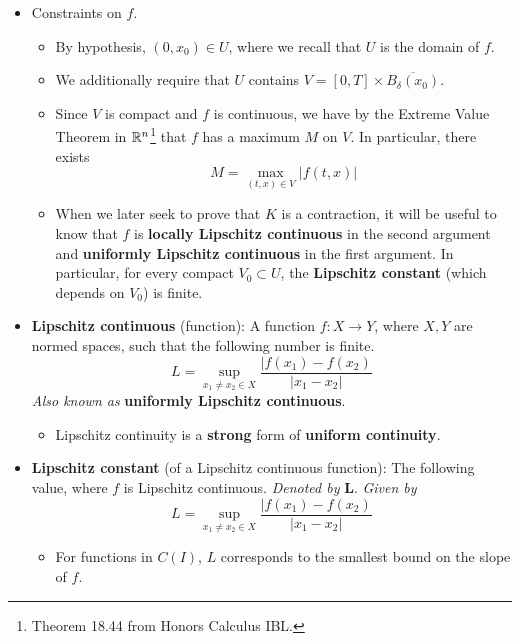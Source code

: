 \documentclass[../notes.tex]{subfiles}
\begin{document}
\begin{itemize}
\begin{itemize}
    \end{itemize}
    \item Constraints on $f$.
    \begin{itemize}
        \item By hypothesis, $(0,x_0)\in U$, where we recall that $U$ is the domain of $f$.
        \item We additionally require that $U$ contains $V=[0,T]\times\overline{B_\delta(x_0)}$.
        \item Since $V$ is compact and $f$ is continuous, we have by the Extreme Value Theorem in $\mathbb{R}^n$\footnote{Theorem 18.44 from Honors Calculus IBL.} that $f$ has a maximum $M$ on $V$. In particular, there exists
        \begin{equation*}
            M = \max_{(t,x)\in V}|f(t,x)|
        \end{equation*}
        \item When we later seek to prove that $K$ is a contraction, it will be useful to know that $f$ is \textbf{locally Lipschitz continuous} in the second argument and \textbf{uniformly Lipschitz continuous} in the first argument. In particular, for every compact $V_0\subset U$, the \textbf{Lipschitz constant} (which depends on $V_0$) is finite.
    \end{itemize}
    \item \textbf{Lipschitz continuous} (function): A function $f:X\to Y$, where $X,Y$ are normed spaces, such that the following number is finite.
    \begin{equation*}
        L = \sup_{x_1\neq x_2\in X}\frac{|f(x_1)-f(x_2)}{|x_1-x_2|}
    \end{equation*}
    \emph{Also known as} \textbf{uniformly Lipschitz continuous}.
    \begin{itemize}
        \item Lipschitz continuity is a \textbf{strong} form of \textbf{uniform continuity}.
    \end{itemize}
    \item \textbf{Lipschitz constant} (of a Lipschitz continuous function): The following value, where $f$ is Lipschitz continuous. \emph{Denoted by} $\bm{L}$. \emph{Given by}
    \begin{equation*}
        L = \sup_{x_1\neq x_2\in X}\frac{|f(x_1)-f(x_2)}{|x_1-x_2|}
    \end{equation*}
    \begin{itemize}
        \item For functions in $C(I)$, $L$ corresponds to the smallest bound on the slope of $f$.

\end{itemize}
\end{itemize}
\end{document}
